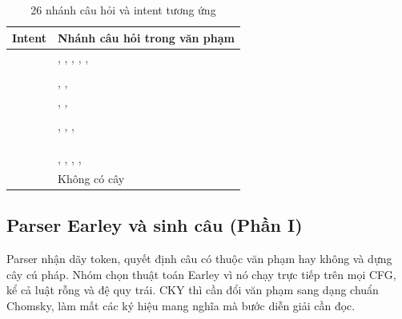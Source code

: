 \begin{table}[htbp]
  \centering
  \small
  \begin{tabularx}{\linewidth}{|P{3.3cm}|L|}
    \hline
    \textbf{Intent} & \textbf{Nhánh câu hỏi trong văn phạm} \\ \hline
     & , ,
      , ,
      ,  \\ \hline
     &  \\ \hline
     & , ,
       \\ \hline
     & , ,
       \\ \hline
     &  \\ \hline
     & , ,
      ,  \\ \hline
     &  \\ \hline
     &  \\ \hline
     &  \\ \hline
     & ,
      , ,
      ,  \\ \hline
     & Không có cây \\ \hline
  \end{tabularx}
  \caption{26 nhánh câu hỏi và intent tương ứng}
  \label{tab:branches}
\end{table}

\subsection{Parser Earley và sinh câu (Phần I)}

Parser nhận dãy token, quyết định câu có thuộc văn phạm hay không và dựng cây cú pháp. Nhóm
chọn thuật toán Earley \cite{earley1970,jurafsky} vì nó chạy trực tiếp trên mọi CFG, kể cả
luật rỗng và đệ quy trái. CKY thì cần đổi văn phạm sang dạng chuẩn Chomsky, làm mất các ký
hiệu mang nghĩa mà bước diễn giải cần đọc.

